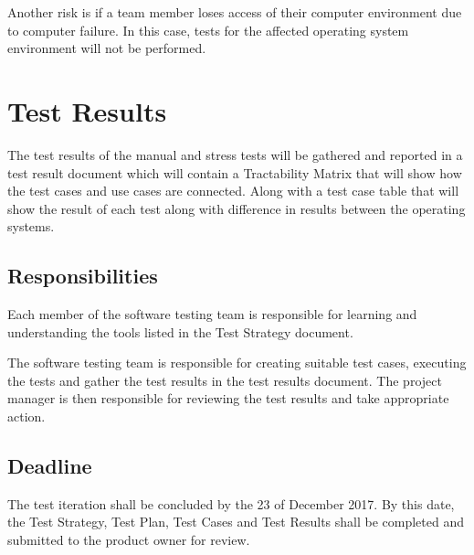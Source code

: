 \documentclass[a4paper, 12pt]{article}
\begin{document}
Another risk is if a team member loses access of their computer environment due to computer failure. In this case, tests for the affected operating system environment will not be performed.

\section{Test Results}
The test results of the manual and stress tests will be gathered and reported in a test result document which will contain a Tractability Matrix that will show how the test cases and use cases are connected. Along with a test case table that will show the result of each test along with difference in results between the operating systems.

\subsection{Responsibilities}
Each member of the software testing team is responsible for learning and understanding the tools listed in the Test Strategy document. 

The software testing team is responsible for creating suitable test cases, executing the tests and gather the test results in the test results document. The project manager is then responsible for reviewing the test results and take appropriate action.

\subsection{Deadline}
The test iteration shall be concluded by the 23 of December 2017. By this date, the Test Strategy, Test Plan, Test Cases and Test Results shall be completed and submitted to the product owner for review. 
\end{document}
